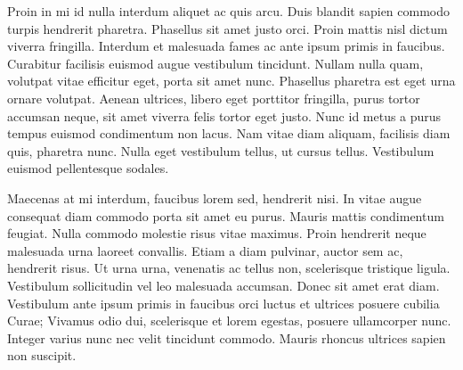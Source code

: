 Proin in mi id nulla interdum aliquet ac quis arcu. Duis blandit
sapien commodo turpis hendrerit pharetra. Phasellus sit amet justo
orci. Proin mattis nisl dictum viverra fringilla. Interdum et
malesuada fames ac ante ipsum primis in faucibus. Curabitur facilisis
euismod augue vestibulum tincidunt. Nullam nulla quam, volutpat vitae
efficitur eget, porta sit amet nunc. Phasellus pharetra est eget urna
ornare volutpat. Aenean ultrices, libero eget porttitor fringilla,
purus tortor accumsan neque, sit amet viverra felis tortor eget
justo. Nunc id metus a purus tempus euismod condimentum non lacus. Nam
vitae diam aliquam, facilisis diam quis, pharetra nunc. Nulla eget
vestibulum tellus, ut cursus tellus. Vestibulum euismod pellentesque
sodales.

Maecenas at mi interdum, faucibus lorem sed, hendrerit nisi. In vitae
augue consequat diam commodo porta sit amet eu purus. Mauris mattis
condimentum feugiat. Nulla commodo molestie risus vitae maximus. Proin
hendrerit neque malesuada urna laoreet convallis. Etiam a diam
pulvinar, auctor sem ac, hendrerit risus. Ut urna urna, venenatis ac
tellus non, scelerisque tristique ligula. Vestibulum sollicitudin vel
leo malesuada accumsan. Donec sit amet erat diam. Vestibulum ante
ipsum primis in faucibus orci luctus et ultrices posuere cubilia
Curae; Vivamus odio dui, scelerisque et lorem egestas, posuere
ullamcorper nunc. Integer varius nunc nec velit tincidunt
commodo. Mauris rhoncus ultrices sapien non suscipit.


\endinput